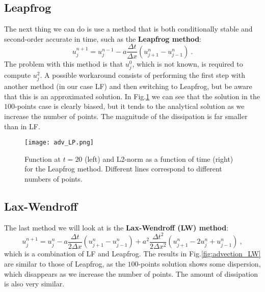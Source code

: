 \vspace{4mm} 
\subsection{Leapfrog} \label{advection_LP}
The next thing we can do is use a method that is both conditionally stable and second-order accurate in time, such as the \textbf{Leapfrog method}:
\begin{equation}
    u_j^{n+1} = u_j^{n-1} - a\frac{\Delta t}{\Delta x} \left(u_{j+1}^n - u_{j-1}^n\right) \:.
    \label{eq:LP}
\end{equation}
The problem with this method is that $u_j^0$, which is not known, is required to compute $u_j^2$. A possible workaround consists of performing the first step with another method (in our case LF) and then switching to Leapfrog, but be aware that this is an approximated solution. In Fig.\ref{fig:advection_LP} we can see that the solution in the $100$-points case is clearly biased, but it tends to the analytical solution as we increase the number of points. The magnitude of the dissipation is far smaller than in LF.

\begin{figure}[h!]
    \centering
    \texttt{[image: adv\_LP.png]}
    \caption{\small Function at $t=20$ (left) and L2-norm as a function of time (right) for the Leapfrog method. Different lines correspond to different numbers of points.}
    \label{fig:advection_LP}
\end{figure}




\vspace{4mm} 
\subsection{Lax-Wendroff} \label{advection_LW}
The last method we will look at is the \textbf{Lax-Wendroff (LW) method}:
\begin{equation}
    u_j^{n+1} = u_j^n - a\frac{\Delta t}{2\Delta x} \left(u_{j+1}^n - u_{j-1}^n\right) +  a^2\frac{\Delta t^2}{2\Delta x^2}\left(u_{j+1}^n - 2u_j^n + u_{j-1}^n\right) \:,
    \label{eq:LW}
\end{equation}
which is a combination of LF and Leapfrog. The results in Fig.\ref{fig:advection_LW} are similar to those of Leapfrog, as the $100$-points solution shows some dispersion, which disappears as we increase the number of points. The amount of dissipation is also very similar.

